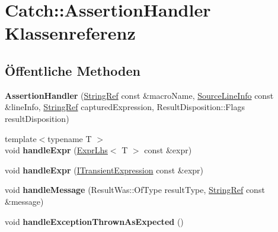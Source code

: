 \hypertarget{classCatch_1_1AssertionHandler}{}\section{Catch\+:\+:Assertion\+Handler Klassenreferenz}
\label{classCatch_1_1AssertionHandler}
\subsection*{Öffentliche Methoden}
\begin{DoxyCompactItemize}
\item 
\mbox{\label{classCatch_1_1AssertionHandler_a32efbb1b56b71d758d4c2094bac1f1a9}} 
{\bfseries Assertion\+Handler} (\hyperlink{classCatch_1_1StringRef}{String\+Ref} const \&macro\+Name, \hyperlink{structCatch_1_1SourceLineInfo}{Source\+Line\+Info} const \&line\+Info, \hyperlink{classCatch_1_1StringRef}{String\+Ref} captured\+Expression, Result\+Disposition\+::\+Flags result\+Disposition)
\item 
\mbox{\label{classCatch_1_1AssertionHandler_a2ef387e567bad90ec6e4b5bf5c367388}} 
{\footnotesize template$<$typename T $>$ }\\void {\bfseries handle\+Expr} (\hyperlink{classCatch_1_1ExprLhs}{Expr\+Lhs}$<$ T $>$ const \&expr)
\item 
\mbox{\label{classCatch_1_1AssertionHandler_afe14d9cf1b1c7f70dae439fbdb51d0c4}} 
void {\bfseries handle\+Expr} (\hyperlink{structCatch_1_1ITransientExpression}{I\+Transient\+Expression} const \&expr)
\item 
\mbox{\label{classCatch_1_1AssertionHandler_abdb4c180ed83ec2858b2fb87712c516d}} 
void {\bfseries handle\+Message} (Result\+Was\+::\+Of\+Type result\+Type, \hyperlink{classCatch_1_1StringRef}{String\+Ref} const \&message)
\item 
\mbox{\label{classCatch_1_1AssertionHandler_ab6caf765764a4064e90fce829eec201d}} 
void {\bfseries handle\+Exception\+Thrown\+As\+Expected} ()
\item 
\mbox{\label{classCatch_1_1AssertionHandler_a7764d0adb6ed5eeb10964f6abc02fab1}} 

\end{DoxyCompactItemize}
